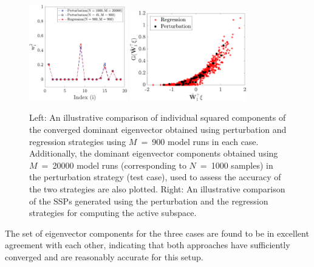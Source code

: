 %
\begin{figure}[htbp]
 \begin{center}
  \includegraphics[width=0.38\textwidth]{./Figures/eig_conv19D}
  \includegraphics[width=0.45\textwidth]{./Figures/comp_ssp19D}
\caption{Left: An illustrative comparison of individual squared components of the converged dominant
eigenvector obtained using perturbation and regression strategies using $M$~=~900 model runs in each case. 
Additionally, the dominant eigenvector components obtained using $M$~=~20000 model runs (corresponding to 
$N$~=~1000 samples)
in the perturbation strategy (test case), used to assess the accuracy of the two strategies are also plotted.
Right: An illustrative comparison of the SSPs generated using the
perturbation and the regression strategies for computing the active subspace. 
}
\label{fig:comp}
\end{center}
\end{figure}
%
The set of eigenvector components for the three cases are found to be in excellent agreement with
each other, indicating that both
approaches have sufficiently converged and are reasonably accurate for this setup.

